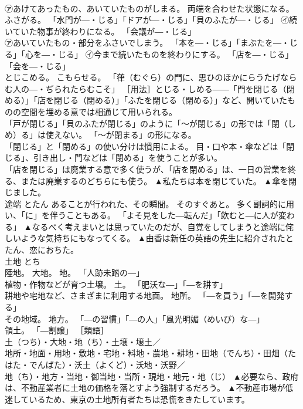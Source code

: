 \documentclass[8pt]{extreport}
\begin{document}
\begin{CJK}{UTF8}{min}
\\	㋐あけてあったもの、あいていたものがしまる。 両端を合わせた状態になる。 ふさがる。 「水門が―・じる」「ドアが―・じる」「貝のふたが―・じる」 ㋑続いていた物事が終わりになる。 「会議が―・じる」 
\\	㋐あいていたもの・部分をふさいでしまう。 「本を―・じる」「まぶたを―・じる」「心を―・じる」 ㋑今まで続いたものを終わりにする。 「店を―・じる」「会を―・じる」 
\\	とじこめる。 こもらせる。 「葎（むぐら）の門に、思ひのほかにらうたげならむ人の―・ぢられたらむこそ」 ［用法］とじる・しめる――「門を閉じる（閉める）」「店を閉じる（閉める）」「ふたを閉じる（閉める）」など、開いていたものの空間を埋める意では相通じて用いられる。 
\\	「戸が閉じる」「貝のふたが閉じる」のように「〜が閉じる」の形では「閉（しめ）る」は使えない。 「〜が閉まる」の形になる。 
\\	「閉じる」と「閉める」の使い分けは慣用による。 目・口や本・傘などは「閉じる」、引き出し・門などは「閉める」を使うことが多い。 
\\	「店を閉じる」は廃業する意で多く使うが、「店を閉める」は、一日の営業を終る、または廃業するのどちらにも使う。	▲私たちは本を閉じていた。 ▲傘を閉じました。
\\	途端	とたん	あることが行われた、その瞬間。 そのすぐあと。 多く副詞的に用い、「に」を伴うこともある。 「よそ見をした―転んだ」「飲むと―に人が変わる」	▲なるべく考えまいとは思っていたのだが、自覚をしてしまうと途端に侘しいような気持ちにもなってくる。 ▲由香は新任の英語の先生に紹介されたとたん、恋におちた。
\\	土地	とち	
\\	陸地。 大地。 地。 「人跡未踏の―」 
\\	植物・作物などが育つ土壌。 土。 「肥沃な―」「―を耕す」 
\\	耕地や宅地など、さまざまに利用する地面。 地所。 「―を買う」「―を開発する」 
\\	その地域。 地方。 「―の習慣」「―の人」「風光明媚（めいび）な―」 
\\	領土。 「―割譲」 ［類語］
\\	土（つち）・大地・地（ち）・土壌・壌土／
\\	地所・地面・用地・敷地・宅地・料地・農地・耕地・田地（でんち）・田畑（たはた・でんばた）・沃土（よくど）・沃地・沃野／
\\	地（ち）・地方・当地・御当地・当所・現地・地元・地（じ）	▲必要なら、政府は、不動産業者に土地の価格を落とすよう強制するだろう。 ▲不動産市場が低迷しているため、東京の土地所有者たちは恐慌をきたしています。

\end{CJK}
\end{document}
